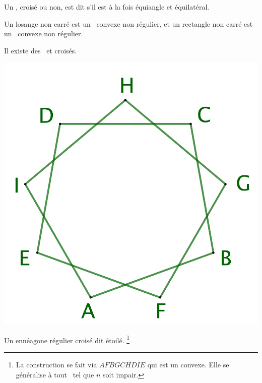 \begin{defi}
	Un \ngone, croisé ou non, est dit  s'il est à la fois équiangle et équilatéral.
\end{defi}


\begin{remark}
	Un losange non carré est un \nequi\ convexe non régulier, et un rectangle non carré est un \niso\ convexe non régulier.
\end{remark}


\begin{remark}
	Il existe des \nregs\ et croisés.


    \vspace{-1.5em}
    
    \begin{multicols}{2}
    	\small\itshape\centering
    	
	    \null\vfill

	    \includegraphics[scale=.175]{content/polygon/def/9-iso-non-conv.png}
    
        \smallskip
        Un ennéagone régulier croisé dit étoilé.%
	    \footnote{
	        La construction se fait via $AFBGCHDIE$ qui est un  convexe. Elle se généralise à tout \nreg\ tel que $n$ soit impair.
	    }



\end{multicols}
\end{remark}
